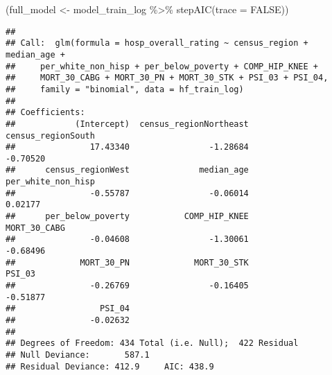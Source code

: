 \documentclass[
]{article}
\newenvironment{Shaded}{\begin{snugshade}}{\end{snugshade}}
\newcommand{\AttributeTok}[1]{\textcolor[rgb]{0.77,0.63,0.00}{#1}}
\newcommand{\CommentTok}[1]{\textcolor[rgb]{0.56,0.35,0.01}{\textit{#1}}}
\newcommand{\ConstantTok}[1]{\textcolor[rgb]{0.00,0.00,0.00}{#1}}
\newcommand{\DecValTok}[1]{\textcolor[rgb]{0.00,0.00,0.81}{#1}}
\newcommand{\FloatTok}[1]{\textcolor[rgb]{0.00,0.00,0.81}{#1}}
\newcommand{\FunctionTok}[1]{\textcolor[rgb]{0.00,0.00,0.00}{#1}}
\newcommand{\NormalTok}[1]{#1}
\newcommand{\OtherTok}[1]{\textcolor[rgb]{0.56,0.35,0.01}{#1}}
\newcommand{\SpecialCharTok}[1]{\textcolor[rgb]{0.00,0.00,0.00}{#1}}
\newcommand{\StringTok}[1]{\textcolor[rgb]{0.31,0.60,0.02}{#1}}
\begin{document}
\begin{Shaded}
\begin{Highlighting}[]
\NormalTok{  (full\_model }\OtherTok{\textless{}{-}}\NormalTok{ model\_train\_log }\SpecialCharTok{\%\textgreater{}\%} \FunctionTok{stepAIC}\NormalTok{(}\AttributeTok{trace =} \ConstantTok{FALSE}\NormalTok{))}
\end{Highlighting}
\end{Shaded}

\begin{verbatim}
## 
## Call:  glm(formula = hosp_overall_rating ~ census_region + median_age + 
##     per_white_non_hisp + per_below_poverty + COMP_HIP_KNEE + 
##     MORT_30_CABG + MORT_30_PN + MORT_30_STK + PSI_03 + PSI_04, 
##     family = "binomial", data = hf_train_log)
## 
## Coefficients:
##            (Intercept)  census_regionNortheast      census_regionSouth  
##               17.43340                -1.28684                -0.70520  
##      census_regionWest              median_age      per_white_non_hisp  
##               -0.55787                -0.06014                 0.02177  
##      per_below_poverty           COMP_HIP_KNEE            MORT_30_CABG  
##               -0.04608                -1.30061                -0.68496  
##             MORT_30_PN             MORT_30_STK                  PSI_03  
##               -0.26769                -0.16405                -0.51877  
##                 PSI_04  
##               -0.02632  
## 
## Degrees of Freedom: 434 Total (i.e. Null);  422 Residual
## Null Deviance:       587.1 
## Residual Deviance: 412.9     AIC: 438.9
\end{verbatim}

\begin{Shaded}
\end{Shaded}
\end{document}
